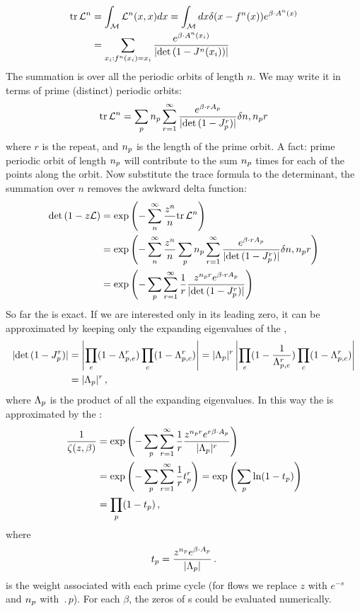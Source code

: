 \begin{description}
\begin{align*}
\mbox{\rm tr}\,  {\cal L}^{n} & =\int_{\mathcal{M}}{\cal L}^{n}(x,x)dx=\int_{\mathcal{M}}dx\delta(x-f^{n}(x))e^{\beta\cdot A^{n}(x)}\\
 & =\sum_{x_{i}:f^{n}(x_{i})=x_{i}}\frac{e^{\beta\cdot A^{n}(x_{i})}}{\vert\mbox{\rm det}\, (1-J^{n}(x_{i}))\vert}
\end{align*}
The summation is over all the periodic orbits of length $n$. We may
write it in terms of prime (distinct) periodic orbits:
\[
\mbox{\rm tr}\,  {\cal L}^{n}=\sum_{p}{n_{p}}\sum_{r=1}^{\infty}
\frac{e^{\beta\cdot rA_{p}}}{\vert\mbox{\rm det}\, (1-J_{p}^{r})\vert}\delta n,{n_{p}}r
\]
where $r$ is the repeat, and ${n_{p}}$ is the length of the
prime orbit. A fact: prime periodic orbit of length ${n_{p}}$ will
contribute to the sum ${n_{p}}$ times for each of the points along
the orbit. Now substitute the trace formula to the determinant, the
summation over $n$ removes the awkward delta function:
\begin{align*}
\mbox{\rm det}\, (1-z{\cal L}) & =\exp\left(-\sum_{n}^{\infty}\frac{z^{n}}{n}\mbox{\rm tr}\,  {\cal L}^{n}\right)\\
 & =\exp\left(-\sum_{n}^{\infty}\frac{z^{n}}{n}\sum_{p}{n_{p}}\sum_{r=1}^{\infty}\frac{e^{\beta\cdot rA_{p}}}{\vert\mbox{\rm det}\, (1-J_{p}^{r})\vert}\delta n,{n_{p}}r\right)\\
 & =\exp\left(-\sum_{p}\sum_{r=1}^{\infty}\frac{1}{r}\frac{z^{{n_{p}}r}e^{\beta\cdot rA_{p}}}{\vert\mbox{\rm det}\, (1-J_{p}^{r})\vert}\right)
\end{align*}
So far the {\Fd} is exact. If we are interested only in its leading
zero, it can be approximated by keeping only the expanding
eigenvalues of the {\jacobianM},
\begin{align*}
\vert\mbox{\rm det}\, (1-J_{p}^{r})\vert
 & =\left|\prod_{e}(1-\Lambda_{p,e}^{r})\prod_{c}(1-\Lambda_{p,c}^{r})\right|
 =\vert\Lambda_{p}\vert^{r}\left|\prod_{e}(1-\frac{1}{\Lambda_{p,e}^{r}})
                                  \prod_{c}(1-\Lambda_{p,c}^{r})\right|\\
 & =\vert\Lambda_{p}\vert^{r}
\,,
\end{align*}
where $\Lambda_{p}$ is the product of all the expanding
eigenvalues. In this way the {\Fd} is approximated by the {\dzeta}:
\begin{align*}
\frac{1}{\zeta(z,\beta)} & =\exp\left(-\sum_{p}\sum_{r=1}^{\infty}\frac{1}{r}\frac{z^{{n_{p}}r}e^{r\beta\cdot A_{p}}}{\vert\Lambda_{p}\vert^{r}}\right)\\
 & =\exp\left(-\sum_{p}\sum_{r=1}^{\infty}\frac{1}{r}t_{p}^{r}\right)
   =\exp\left(\sum_{p}\ln(1-t_{p})\right)\\
 & =\prod_{p}(1-t_{p})
\,,
\end{align*}
where
\[
t_{p}=\frac{z^{{n_{p}}}e^{\beta\cdot A_{p}}}{\vert\Lambda_{p}\vert}
\,.
\]
is the weight associated with each prime cycle (for flows we
replace $z$ with $e^{-s}$ and ${n_{p}}$ with $\period{p}$). For each
$\beta$, the zeros of {\dzeta}s could be evaluated
numerically.


\end{description}
